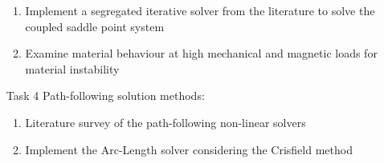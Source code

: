 \begin{enumerate}
\begin{enumerate}
\item Implement a segregated iterative solver from the literature \cite{Benzi2005} to solve the coupled saddle point system
\item Examine material behaviour at high mechanical and magnetic loads for material instability
\end{enumerate}
\item[Task 4] Path-following solution methods:
\begin{enumerate}
\item Literature survey of the path-following non-linear solvers \cite{Vasios, Wriggers2008, Riks1979, CRISFIELD1981}
\item Implement the Arc-Length solver considering the Crisfield method
\end{enumerate}
\end{enumerate}